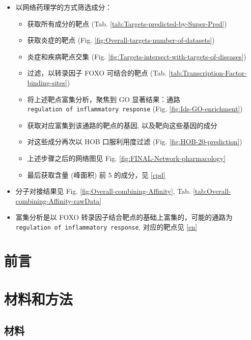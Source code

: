 \documentclass[
]{article}
\providecommand{\tightlist}{%
  \setlength{\itemsep}{0pt}\setlength{\parskip}{0pt}}
\begin{document}
\begin{itemize}
\tightlist
\item
  以网络药理学的方式筛选成分：

  \begin{itemize}
  \tightlist
  \item
    获取所有成分的靶点 (Tab. \ref{tab:Targets-predicted-by-Super-Pred})
  \item
    获取炎症的靶点 (Fig. \ref{fig:Overall-targets-number-of-datasets})
  \item
    炎症和疾病靶点交集 (Fig. \ref{fig:Targets-intersect-with-targets-of-diseases})
  \item
    过滤，以转录因子 FOXO 可结合的靶点 (Tab. \ref{tab:Transcription-Factor-binding-sites})
  \item
    将上述靶点富集分析，聚焦到 GO 显著结果：通路 \texttt{regulation\ of\ inflammatory\ response} (Fig. \ref{fig:Ids-GO-enrichment})
  \item
    获取对应富集到该通路的靶点的基因, 以及靶向这些基因的成分
  \item
    对这些成分再次以 HOB 口服利用度过滤 (Fig. \ref{fig:HOB-20-prediction})
  \item
    上述步骤之后的网络图见 Fig. \ref{fig:FINAL-Network-pharmacology}
  \item
    最后获取含量 (峰面积) 前 5 的成分，见 \ref{cpd}
  \end{itemize}
\item
  分子对接结果见 Fig. \ref{fig:Overall-combining-Affinity}, Tab. \ref{tab:Overall-combining-Affinity-rawData}
\item
  富集分析是以 FOXO 转录因子结合靶点的基础上富集的，可能的通路为 \texttt{regulation\ of\ inflammatory\ response}, 对应的靶点见 \ref{en}
\end{itemize}

\hypertarget{introduction}{%
\section{前言}\label{introduction}}

\hypertarget{methods}{%
\section{材料和方法}\label{methods}}

\hypertarget{ux6750ux6599}{%
\subsection{材料}\label{ux6750ux6599}}
\end{document}
